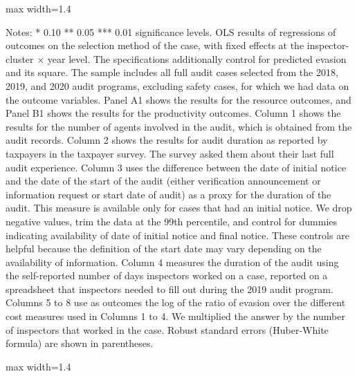 \documentclass{article}
\newcommand{\OutPath}{Output/}%
\newcommand{\OutPath}{../Output/}%
\begin{document}
\begin{landscape}
\begin{table}[H]
\begin{adjustbox}{max width=1.4\textwidth}
\begin{threeparttable}
\footnotesize


\begin{tablenotes}[flushleft]
\footnotesize
\item Notes: * 0.10 ** 0.05 *** 0.01 significance levels. OLS results of regressions of outcomes on the selection method of the case, with fixed effects at the inspector-cluster $\times$ year level. The specifications additionally control for predicted evasion and its square. The sample includes all full audit cases selected from the 2018, 2019, and 2020 audit programs, excluding safety cases, for which we had data on the outcome variables. Panel A1 shows the results for the resource outcomes, and Panel B1 shows the results for the productivity outcomes. Column 1 shows the results for the number of agents involved in the audit, which is obtained from the audit records. Column 2 shows the results for audit duration as reported by taxpayers in the taxpayer survey. The survey asked them about their last full audit experience. Column 3 uses the difference between the date of initial notice and the date of the start of the audit (either verification announcement or information request or start date of audit) as a proxy for the duration of the audit. This measure is available only for cases that had an initial notice. We drop negative values, trim the data at the 99th percentile, and control for dummies indicating availability of date of initial notice and final notice. These controls are helpful because the definition of the start date may vary depending on the availability of information. Column 4 measures the duration of the audit using the self-reported number of days inspectors worked on a case, reported on a spreadsheet that inspectors needed to fill out during the 2019 audit program. Columns 5 to 8 use as outcomes the log of the ratio of evasion over the different cost measures used in Columns 1 to 4. We multiplied the answer by the number of inspectors that worked in the case. Robust standard errors (Huber-White formula) are shown in parentheses.
\end{tablenotes}
\end{threeparttable}
\end{adjustbox}
\end{table}

\begin{table}[H]\centering
\begin{adjustbox}{max width=1.4\textwidth}
\begin{threeparttable}
\caption{Resources Allocated to Audits and Audit Productivity, Full Audits, with Predicted Evasion Decile Controls (Panels A1 and B1 only)}
\label{tab:table5_fullaudits_yhatrf_deciles_control}


\end{threeparttable}
\end{adjustbox}
\end{table}
\end{landscape}
\end{document}
